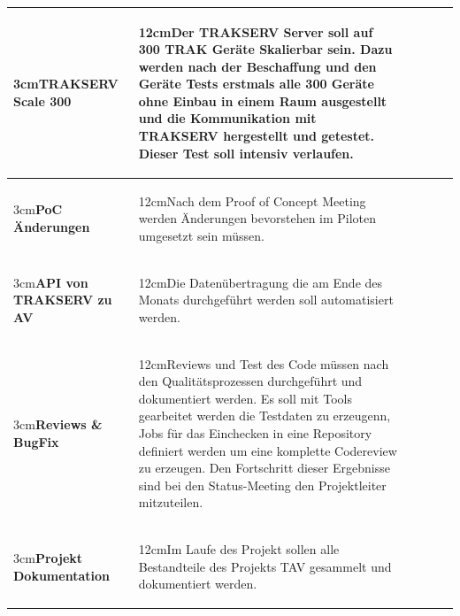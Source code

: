 \documentclass[a4paper,10pt]{scrartcl}
\newcommand\Umbruch[2][3cm]{\begin{varwidth}{#1}\centering#2\end{varwidth}}
\newcommand\Absatz[2][12cm]{\begin{varwidth}{#1}\flushleft#2\end{varwidth}}
\begin{document}
\begin{adjustbox}{width=\textwidth}
\begin{tabular}{llrrrr}
\midrule
{\Umbruch{\textbf{TRAKSERV Scale 300}}}  & {\Absatz{Der TRAKSERV Server soll auf 300 TRAK Geräte Skalierbar sein. Dazu werden nach der Beschaffung und den Geräte Tests erstmals alle 300 Geräte
ohne Einbau in einem Raum ausgestellt und die Kommunikation mit TRAKSERV hergestellt und getestet.
Dieser Test soll intensiv verlaufen.
\linebreak}} \\
\midrule
{\Umbruch{\textbf{PoC Änderungen}}}  & {\Absatz{Nach dem Proof of Concept Meeting werden Änderungen bevorstehen im Piloten umgesetzt sein müssen.\linebreak}} \\
\midrule
{\Umbruch{\textbf{API von TRAKSERV zu AV}}}  & {\Absatz{Die Datenübertragung die am Ende des Monats durchgeführt werden soll automatisiert werden.\linebreak}} \\
\midrule
{\Umbruch{\textbf{Reviews \& BugFix}}}  & {\Absatz{Reviews und Test des Code müssen nach den Qualitätsprozessen durchgeführt und dokumentiert werden. Es soll mit Tools gearbeitet werden die Testdaten zu erzeugenn, Jobs für das Einchecken in eine Repository definiert werden
um eine komplette Codereview zu erzeugen. Den Fortschritt dieser Ergebnisse sind bei den Status-Meeting den Projektleiter mitzuteilen. \linebreak}} \\
\midrule
{\Umbruch{\textbf{Projekt Dokumentation}}}  & {\Absatz{Im Laufe des Projekt sollen alle Bestandteile des Projekts TAV gesammelt und dokumentiert werden.\linebreak}} \\
\bottomrule
\end{tabular}
\end{adjustbox}

\pagebreak
\end{document}
